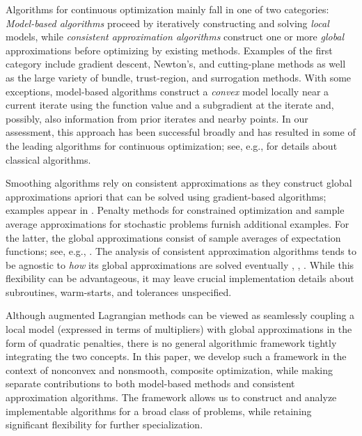 \documentclass[smallextended,envcountsect]{svjour3}
\begin{document}
Algorithms for continuous optimization mainly fall in one of two categories: {\em Model-based algorithms} proceed by iteratively constructing and solving {\em local} models, while {\em consistent approximation algorithms} construct one or more {\em global} approximations before optimizing by existing methods. Examples of the first category include gradient descent, Newton's, and cutting-plane methods as well as the large variety of bundle, trust-region, and surrogation methods. With some exceptions, model-based algorithms construct a {\em convex} model locally near a current iterate using the function value and a subgradient at the iterate and, possibly, also information from prior iterates and nearby points. In our assessment, this approach has been successful broadly and has resulted in some of the leading algorithms for continuous optimization; see, e.g.,  \cite{ConnGouldToint.00, NocedalWright.06,Ruszczynski.06} for details about classical algorithms. 

Smoothing algorithms rely on consistent approximations as they construct global approximations apriori that can be solved using gradient-based algorithms; examples appear in \cite{PeeRoyset2011,Chen.12,BurkeHoheisel.13}. Penalty methods for constrained optimization and sample average approximations for stochastic problems furnish additional examples. For the latter, the global approximations consist of sample averages of expectation functions; see, e.g., \cite{Shapiro2021a}. The analysis of consistent approximation algorithms tends to be agnostic to {\em how} its global approximations are  solved eventually \cite{Royset2023a}, \cite[\S\, 4.C]{Royset_Wets_2021}, \cite[\S\, 3.3]{Polak1997}. While this flexibility can be advantageous, it may leave crucial implementation details about subroutines, warm-starts, and tolerances unspecified. 

Although augmented Lagrangian methods can be viewed as seamlessly coupling a local model (expressed in terms of multipliers) with global approximations in the form of quadratic penalties, there is no general algorithmic framework tightly integrating the two concepts. In this paper, we develop such a framework in the context of nonconvex and nonsmooth, composite optimization, while making separate contributions to both model-based methods and consistent approximation algorithms. The framework allows us to construct and analyze implementable algorithms for a broad class of problems, while retaining significant flexibility for further specialization. 
\end{document}
